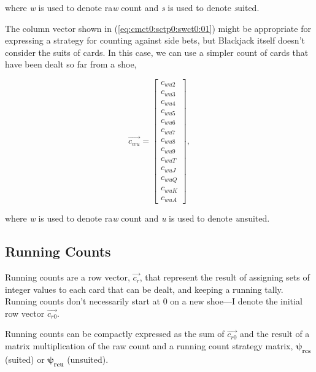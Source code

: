 \noindent{}where \emph{w} is used to denote ra\emph{w} count and 
\emph{s} is used to denote \emph{s}uited.

The column vector shown in (\ref{eq:cmct0:sctp0:swct0:01}) might be appropriate
for expressing a strategy for counting against side bets, but Blackjack itself
doesn't consider the suits of cards.  In this case, we can use a simpler count
of cards that have been dealt so far from a shoe,

\begin{equation}
\label{eq:cmct0:sctp0:swct0:02}
\overrightarrow{c_{wu}}
=
\left[ \begin{array}{c}
c_{wu2}   \\
c_{wu3}   \\
c_{wu4}   \\
c_{wu5}   \\
c_{wu6}   \\
c_{wu7}   \\
c_{wu8}   \\
c_{wu9}   \\
c_{wuT}   \\
c_{wuJ}   \\
c_{wuQ}   \\
c_{wuK}   \\
c_{wuA}
\end{array}\right],
\end{equation}

\noindent{}where \emph{w} is used to denote ra\emph{w} count and 
\emph{u} is used to denote \emph{u}nsuited.


\subsection{Running Counts}
\label{cmct0:sctp0:srct0}

Running counts are a row vector, $\overrightarrow{c_{r}}$, that represent the
result of assigning sets of integer values to each card that can be dealt, and keeping
a running tally.  Running counts don't necessarily start at 0 on a new shoe---I denote the
initial row vector $\overrightarrow{c_{r0}}$.

Running counts can be compactly expressed as the sum of $\overrightarrow{c_{r0}}$
and the result of a matrix multiplication
of the raw count and a running count strategy matrix, $\boldsymbol{\psi_{rcs}}$ (suited) or
$\boldsymbol{\psi_{rcu}}$ (unsuited).

